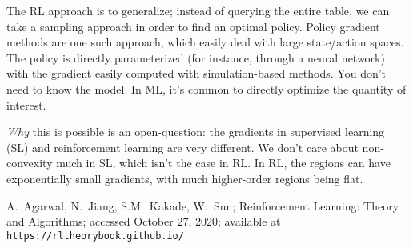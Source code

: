 \documentclass[12pt,reqno]{amsart}
\begin{document}
The RL approach is to generalize; instead of querying the entire table, we can take a sampling approach in order to find an optimal policy. Policy gradient methods are one such approach, which easily deal with large state/action spaces. The policy is directly parameterized (for instance, through a neural network) with the gradient easily computed with simulation-based methods. You don't need to know the model. In ML, it's common to directly optimize the quantity of interest. 

\textit{Why} this is possible is an open-question: the gradients in supervised learning (SL) and reinforcement learning are very different. We don't care about non-convexity much in SL, which isn't the case in RL. In RL, the regions can have exponentially small gradients, with much higher-order regions being flat.


\begin{thebibliography}{99}

 A.\ Agarwal, N.\ Jiang, S.M.\ Kakade, W.\ Sun; Reinforcement Learning: Theory and Algorithms; accessed October 27, 2020; available at \texttt{https://rltheorybook.github.io/}
\end{thebibliography}
\end{document}
